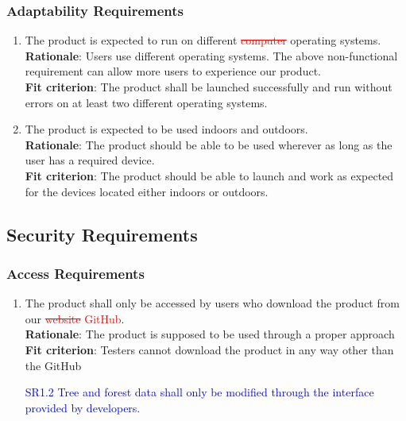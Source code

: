 \documentclass{article}
\begin{document}
\subsubsection{Adaptability Requirements}
\begin{enumerate}[MS3.1]
    \item The product is expected to run on different \textcolor{red}{\st{computer}} 
    operating systems.\\
    \textbf{Rationale}: Users use different operating systems. The above 
    non-functional requirement can allow more users to experience our product.\\
    \textbf{Fit criterion}: The product shall be launched successfully and run without errors on at
     least two different operating systems.\\
    
    \item The product is expected to be used indoors and outdoors.\\
    \textbf{Rationale}: The product should be able to be used wherever as long as the user has a
     required device.\\
    \textbf{Fit criterion}: The product should be able to launch and work as expected for the devices
     located either indoors or outdoors. \\
\end{enumerate}
\subsection{Security Requirements}
\subsubsection{Access Requirements}
\begin{enumerate}[SR1.1]
    \item The product shall only be accessed by users who download the product from our
     \textcolor{red}{\st{website} GitHub}.\\
    \textbf{Rationale}: The product is supposed to be used through a proper approach\\
    \textbf{Fit criterion}: Testers cannot download the product in any way other than the GitHub
    
    \item[\textcolor{blue}{SR1.2}] \textcolor{blue}{Tree and forest
    data shall only be modified through the interface provided by developers.}
\end{enumerate}
\end{document}
